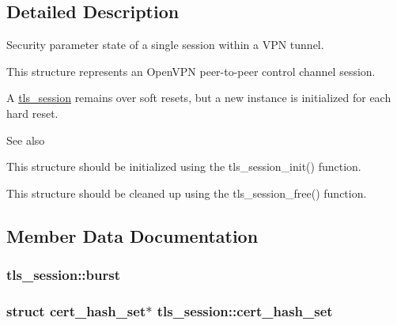 \subsection{Detailed Description}
Security parameter state of a single session within a V\+P\+N tunnel.

This structure represents an Open\+V\+P\+N peer-\/to-\/peer control channel session.

A {\ttfamily \hyperlink{structtls__session}{tls\+\_\+session}} remains over soft resets, but a new instance is initialized for each hard reset.

\begin{DoxySeeAlso}{See also}

\begin{DoxyItemize}
\item This structure should be initialized using the {\ttfamily tls\+\_\+session\+\_\+init()} function.
\item This structure should be cleaned up using the {\ttfamily tls\+\_\+session\+\_\+free()} function. 
\end{DoxyItemize}
\end{DoxySeeAlso}


\subsection{Member Data Documentation}
\hypertarget{structtls__session_ad3ba3d680dfcedd825add2385c0b0af9}{}
\subsubsection[{burst}]{ tls\+\_\+session\+::burst}\label{structtls__session_ad3ba3d680dfcedd825add2385c0b0af9}
\hypertarget{structtls__session_a344489ec127b5681fe3cf90e72b85466}{}
\subsubsection[{cert\+\_\+hash\+\_\+set}]{\setlength{\rightskip}{0pt plus 5cm}struct {\bf cert\+\_\+hash\+\_\+set}$\ast$ tls\+\_\+session\+::cert\+\_\+hash\+\_\+set}\label{structtls__session_a344489ec127b5681fe3cf90e72b85466}
\hypertarget{structtls__session_a83a9f4e9d176b93ca7575ff7e3e30c07}{}
